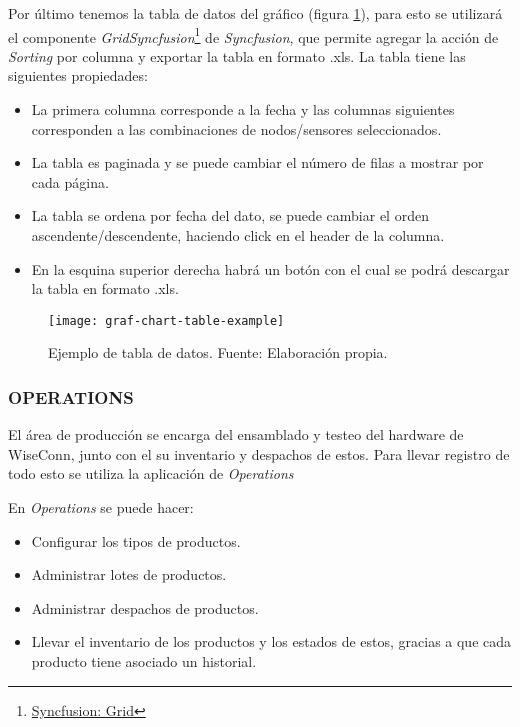 Por último tenemos la tabla de datos del gráfico (figura \ref{fig:graf-chart-table-example}), para esto se utilizará el componente \textit{Grid}\textit{Syncfusion}\footnote{\href{https://ej2.syncfusion.com/react/documentation/grid/getting-started}{Syncfusion: Grid}} de \textit{Syncfusion}, que permite agregar la acción de \textit{Sorting} por columna y exportar la tabla en formato .xls.
La tabla tiene las siguientes propiedades:
\begin{itemize}
    \item La primera columna corresponde a la fecha y las columnas siguientes corresponden a las combinaciones de nodos/sensores seleccionados.
    \item La tabla es paginada y se puede cambiar el número de filas a mostrar por cada página.
    \item La tabla se ordena por fecha del dato, se puede cambiar el orden ascendente/descendente, haciendo click en el header de la columna.
    \item En la esquina superior derecha habrá un botón con el cual se podrá descargar la tabla en formato .xls.
\end{itemize}

\begin{figure}[H]
	\centering
	\texttt{[image: graf-chart-table-example]}
	\caption{\label{fig:graf-chart-table-example} Ejemplo de tabla de datos. Fuente: Elaboración propia.}
\end{figure}

\subsubsection{OPERATIONS}

El área de producción se encarga del ensamblado y testeo del hardware de WiseConn, junto con el su inventario y despachos de estos. Para llevar registro de todo esto se utiliza la aplicación de \textit{Operations}

En \textit{Operations} se puede hacer:

\begin{itemize}
    \item Configurar los tipos de productos.
    \item Administrar lotes de productos.
    \item Administrar despachos de productos.
    \item Llevar el inventario de los productos y los estados de estos, gracias a que cada producto tiene asociado un historial.
\end{itemize}

